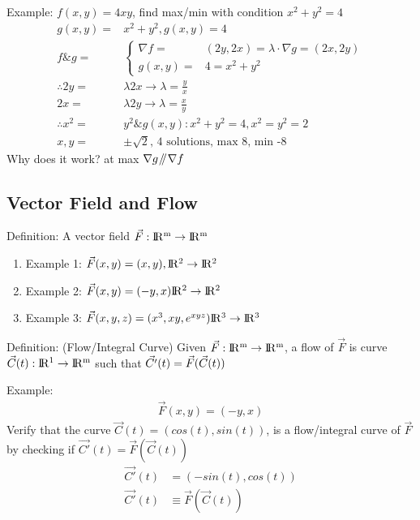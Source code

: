 \documentclass{article}
\newcommand{\R}{\rm I\!R}
\newcommand{\parallelsum}{\mathbin{\!/\mkern-5mu/\!}}
\begin{document}
        Example: $f(x,y) = 4xy$, find max/min with condition $x^2 + y^2 = 4$
        \begin{align}
            g(x,y) =& x^2 + y^2, g(x,y) = 4\\
            f\&g=&\begin{cases}
                \nabla f =& (2y,2x) = \lambda\cdot\nabla g = (2x,2y)\\
                g(x,y) =& 4 = x^2 + y^2
            \end{cases}\\
            \therefore 2y =& \lambda 2x \rightarrow \lambda = \frac{y}{x}\\
             2x =& \lambda 2y \rightarrow \lambda = \frac{x}{y}\\
            \therefore x^2 =& y^2 \& g(x,y):x^2+y^2 = 4, x^2 = y^2 = 2\\
            x, y =& \pm \sqrt{2}\text{, 4 solutions, max 8, min -8}
        \end{align}
        Why does it work? at max $\nabla g \parallelsum \nabla f$
    \subsection{Vector Field and Flow}
        Definition: A vector field $\vec{F}:\R^m \rightarrow \R^m$
        \begin{enumerate}
            \item Example 1: $\vec{F}(x,y) = (x,y), \R^2\rightarrow \R^2$
            \item Example 2: $\vec{F}(x,y) = (-y,x) \R^2\rightarrow \R^2$
            \item Example 3: $\vec{F}(x,y,z)=(x^3,xy,e^{xyz})\R^3\rightarrow \R^3$
        \end{enumerate}
        Definition: (Flow/Integral Curve) Given $\vec{F}:\R^m \rightarrow \R^m$, a flow of $\vec{F}$ is  curve $\vec{C}(t):\R^1\rightarrow\R^m$ such that $\vec{C'}(t) = \vec{F}(\vec{C}(t))\\$
        
        Example:
        \begin{align}
            \vec{F}(x,y) = (-y,x)
        \end{align}
        Verify that the curve $\vec{C}(t) = (cos(t),sin(t))$, is a flow/integral curve of $\vec{F}$ by checking if $\vec{C'}(t) = \vec{F}(\vec{C}(t))$
        \begin{align}
            \vec{C'}(t) &= (-sin(t),cos(t))\\
            \vec{C'}(t) &\equiv \vec{F}(\vec{C}(t))
        \end{align}
        
\end{document}
